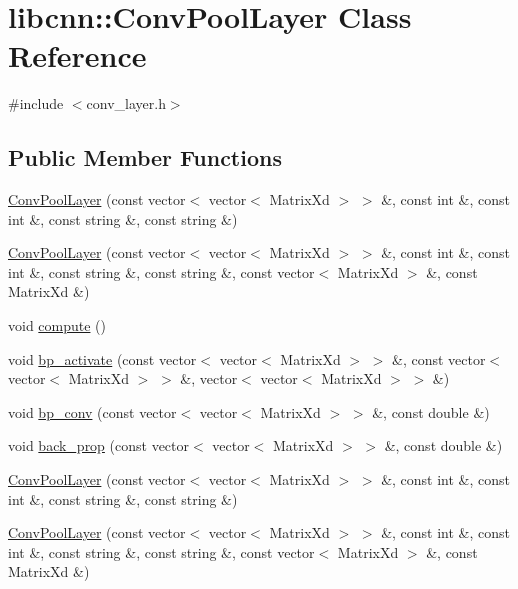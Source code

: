 \hypertarget{classlibcnn_1_1_conv_pool_layer}{\section{libcnn\-:\-:\-Conv\-Pool\-Layer \-Class \-Reference}
\label{classlibcnn_1_1_conv_pool_layer}
}


{\ttfamily \#include $<$conv\-\_\-layer.\-h$>$}

\subsection*{\-Public \-Member \-Functions}
\begin{DoxyCompactItemize}
\item 
\hyperlink{classlibcnn_1_1_conv_pool_layer_a4ef1d6c7eac689b2472815abf5aea08a}{\-Conv\-Pool\-Layer} (const vector$<$ vector$<$ \-Matrix\-Xd $>$ $>$ \&, const int \&, const int \&, const string \&, const string \&)
\item 
\hyperlink{classlibcnn_1_1_conv_pool_layer_ad24c278c8e1ea940eecc862dd8a334c3}{\-Conv\-Pool\-Layer} (const vector$<$ vector$<$ \-Matrix\-Xd $>$ $>$ \&, const int \&, const int \&, const string \&, const string \&, const vector$<$ \-Matrix\-Xd $>$ \&, const \-Matrix\-Xd \&)
\item 
void \hyperlink{classlibcnn_1_1_conv_pool_layer_a29c5445a08cf88d44a69b9370e5adc1d}{compute} ()
\item 
void \hyperlink{classlibcnn_1_1_conv_pool_layer_a32bafdf90d99eb5fc5902f831b208838}{bp\-\_\-activate} (const vector$<$ vector$<$ \-Matrix\-Xd $>$ $>$ \&, const vector$<$ vector$<$ \-Matrix\-Xd $>$ $>$ \&, vector$<$ vector$<$ \-Matrix\-Xd $>$ $>$ \&)
\item 
void \hyperlink{classlibcnn_1_1_conv_pool_layer_a30204d1f55cc343c422cb6da5b1b4590}{bp\-\_\-conv} (const vector$<$ vector$<$ \-Matrix\-Xd $>$ $>$ \&, const double \&)
\item 
void \hyperlink{classlibcnn_1_1_conv_pool_layer_ab74a2227a84ff1de545dd1e69f0c8fb3}{back\-\_\-prop} (const vector$<$ vector$<$ \-Matrix\-Xd $>$ $>$ \&, const double \&)
\item 
\hyperlink{classlibcnn_1_1_conv_pool_layer_a4ef1d6c7eac689b2472815abf5aea08a}{\-Conv\-Pool\-Layer} (const vector$<$ vector$<$ \-Matrix\-Xd $>$ $>$ \&, const int \&, const int \&, const string \&, const string \&)
\item 
\hyperlink{classlibcnn_1_1_conv_pool_layer_ad24c278c8e1ea940eecc862dd8a334c3}{\-Conv\-Pool\-Layer} (const vector$<$ vector$<$ \-Matrix\-Xd $>$ $>$ \&, const int \&, const int \&, const string \&, const string \&, const vector$<$ \-Matrix\-Xd $>$ \&, const \-Matrix\-Xd \&)

\end{DoxyCompactItemize}
